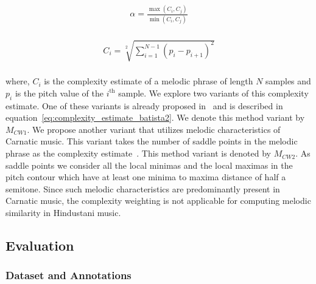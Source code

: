 \begin{equation}
\begin{gathered}
\alpha = \frac{\max(C_i,C_j)}{\min(C_i, C_j)} \\
\end{gathered}
\label{eq:complexity_weighing}
\end{equation}

\begin{equation}
\begin{gathered}
C_i = \sqrt[2]{\sum_{i=1}^{N-1} (p_{i}-p_{i+1})^2}\\
\end{gathered}
\label{eq:complexity_estimate_batista}
\end{equation}

\noindent where, $C_i$ is the complexity estimate of a melodic phrase of length $N$ samples and $p_i$ is the pitch value of the $i^{\mathrm{th}}$ sample. We explore two variants of this complexity estimate. One of these variants is already proposed in~\cite{batista2011complexity} and is described in equation~\ref{eq:complexity_estimate_batista2}. We denote this method variant by $M_{CW1}$. We propose another variant that utilizes melodic characteristics of Carnatic music. This variant takes the number of saddle points in the melodic phrase as the complexity estimate~\citep{Ishwar2013}. This method variant is denoted by $M_{CW2}$. As saddle points we consider all the local minimas and the local maximas in the pitch contour which have at least one minima to maxima distance of half a semitone. Since such melodic characteristics are predominantly present in Carnatic music, the complexity weighting is not applicable for computing melodic similarity in Hindustani music.


\subsection{Evaluation}
\label{sec:patterns_improving_similarity_evaluation}

\subsubsection{Dataset and Annotations}
\label{sec:patterns_improving_similarity_dataset_and_annotations}

